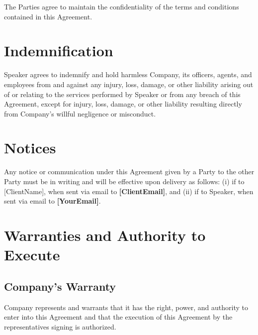\documentclass[a4paper,12pt]{article} %
\newcommand{\YourEmail}{[YourEmail]}
\newcommand{\ClientName}{[ClientName]}
\newcommand{\ClientEmail}{[ClientEmail]}
\begin{document}
The Parties agree to maintain the confidentiality of the terms and conditions contained in this Agreement.


\section{Indemnification}

Speaker agrees to indemnify and hold harmless Company, its officers, agents, and employees from and against any injury, loss, damage, or other liability arising out of or relating to the services performed by Speaker or from any breach of this Agreement, except for injury, loss, damage, or other liability resulting directly from Company's willful negligence or misconduct.


\section{Notices}

Any notice or communication under this Agreement given by a Party to the other Party must be in writing and will be effective upon delivery as follows: (i) if to \ClientName, when sent via email to \textbf{\ClientEmail}, and (ii) if to Speaker, when sent via email to \textbf{\YourEmail}.


\section{Warranties and Authority to Execute}

\subsection{Company's Warranty}

Company represents and warrants that it has the right, power, and authority to enter into this Agreement and that the execution of this Agreement by the representatives signing is authorized.
\end{document}
